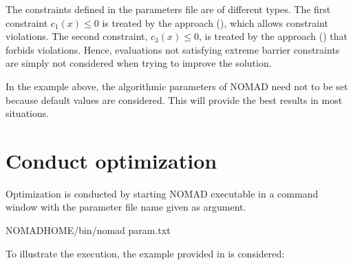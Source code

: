 \documentclass[letterpaper,10pt,english]{sphinxmanual}
\begin{document}
\sphinxAtStartPar
The constraints defined in the parameters file are of different types.
The first constraint \(c_1(x) \leq 0\) is treated by the  approach (), which allows constraint violations.
The second constraint, \(c_3(x) \leq 0\), is treated by the   approach () that forbids violations.
Hence, evaluations not satisfying extreme barrier constraints are simply not considered when trying to improve the solution.

\sphinxAtStartPar
In the example above, the algorithmic parameters of NOMAD need not to be set because default
values are considered. This will provide the best results in most situations.


\section{Conduct optimization}
\label{\detokenize{GettingStarted:conduct-optimization}}\label{\detokenize{GettingStarted:id3}}
\sphinxAtStartPar
Optimization is conducted by starting NOMAD executable in a command window with the parameter file name given as argument.

\begin{sphinxVerbatim}[commandchars=\\\{\}]
\PYGZdl{}NOMAD\PYGZus{}HOME/bin/nomad param.txt
\end{sphinxVerbatim}

\sphinxAtStartPar
To illustrate the execution, the example provided in  is considered:
\end{document}
